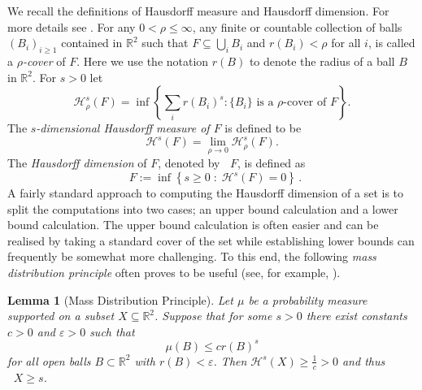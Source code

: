 \documentclass[12pt]{article}
\newtheorem{lemma}[definition]{Lemma}
\theoremstyle{remark}
\numberwithin{equation}{section}
\renewcommand{\Bbb}[1]{\mathbb{#1}}
\newcommand{\R}{{\Bbb R}}        %
\newcommand{\cH}{{\mathcal H}}
\newcommand{\0}{\mathbf{0}}
\DeclareMathOperator{\dimh}{\dim_H}
\begin{document}
We recall the definitions of Hausdorff measure and {Hausdorff} dimension. For more details see \cite{Falconer}. For any $0 < \rho \leq \infty$, any finite or countable collection of balls $(B_i)_{i\geq 1}$ contained in $\R^{2}$ such that
$F\subseteq \bigcup_i B_i$ and $r(B_{i})<\rho$ for all $i$, is called a \emph{$\rho$-cover} of $F$. {Here we use the notation $r(B)$ to denote the radius of a ball $B$ in $\R^2$.} For $s>0$ let
\begin{equation*}
\cH_{\rho}^{s}(F)=\inf \left\{ \sum_{i} r(B_{i})^{s} : \{B_{i}\} \text{ is a $\rho$-cover of } F \right\}.
\end{equation*} 
The \textit{$s$-dimensional Hausdorff measure of $F$} is defined to be
\[
\cH^s(F)=\lim_{\rho\to 0}\cH_\rho^{s}(F).
\]
 The \textit{Hausdorff dimension} of $F$, denoted by $\dimh F$, is defined as
\begin{equation*}
\dimh F := \inf\left\{s\geq 0\;:\; \cH^s(F)=0\right\}\, .
\end{equation*}
{A fairly standard approach to computing the Hausdorff dimension of a set is to split the computations into two cases; an upper bound calculation and a lower bound calculation.} The upper bound calculation is {often} easier and can be realised by taking a standard cover of the set { while establishing lower bounds can frequently be somewhat} more {challenging. To this end,} the following \emph{mass distribution principle} {often proves to be useful (see, for example, \cite[Chapter 4.1]{Falconer}).}

\begin{lemma}[Mass Distribution Principle]\label{Mass distribution principle}
Let $\mu$ be a probability measure supported on a subset $X \subseteq \R^{2}$. Suppose that for {some} $s>0$ there exist constants $c {>0}$ {and} $\varepsilon>0$ such that
\begin{equation*} 
\mu(B) \leq c r(B)^{s}
\end{equation*}
for all open balls $B \subset \R^{2}$ with $r(B)<\varepsilon$. Then $\cH^{s}(X) \geq \frac{1}{c} {>0}$ and thus $\dimh X\geq s$.
\end{lemma}
\par 
\end{document}
